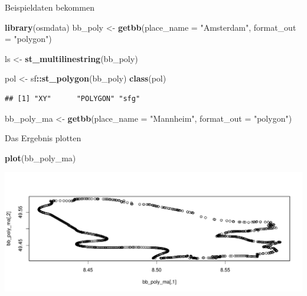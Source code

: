 \documentclass[ignorenonframetext,]{beamer}
\newenvironment{Shaded}{\begin{snugshade}}{\end{snugshade}}
\newcommand{\KeywordTok}[1]{\textcolor[rgb]{0.13,0.29,0.53}{\textbf{#1}}}
\newcommand{\DataTypeTok}[1]{\textcolor[rgb]{0.13,0.29,0.53}{#1}}
\newcommand{\StringTok}[1]{\textcolor[rgb]{0.31,0.60,0.02}{#1}}
\newcommand{\OperatorTok}[1]{\textcolor[rgb]{0.81,0.36,0.00}{\textbf{#1}}}
\newcommand{\NormalTok}[1]{#1}
\begin{document}
\begin{frame}[fragile]{Beispieldaten bekommen}

\begin{Shaded}
\begin{Highlighting}[]
\KeywordTok{library}\NormalTok{(osmdata)}
\NormalTok{bb_poly <-}\StringTok{ }\KeywordTok{getbb}\NormalTok{(}\DataTypeTok{place_name =} \StringTok{"Amsterdam"}\NormalTok{, }
                 \DataTypeTok{format_out =} \StringTok{"polygon"}\NormalTok{)}
\end{Highlighting}
\end{Shaded}

\begin{Shaded}
\begin{Highlighting}[]
\NormalTok{ls <-}\StringTok{ }\KeywordTok{st_multilinestring}\NormalTok{(bb_poly)}
\end{Highlighting}
\end{Shaded}

\begin{Shaded}
\begin{Highlighting}[]
\NormalTok{pol <-}\StringTok{ }\NormalTok{sf}\OperatorTok{::}\KeywordTok{st_polygon}\NormalTok{(bb_poly)}
\KeywordTok{class}\NormalTok{(pol)}
\end{Highlighting}
\end{Shaded}

\begin{verbatim}
## [1] "XY"      "POLYGON" "sfg"
\end{verbatim}

\begin{Shaded}
\begin{Highlighting}[]
\NormalTok{bb_poly_ma <-}\StringTok{ }\KeywordTok{getbb}\NormalTok{(}\DataTypeTok{place_name =} \StringTok{"Mannheim"}\NormalTok{, }
                 \DataTypeTok{format_out =} \StringTok{"polygon"}\NormalTok{)}
\end{Highlighting}
\end{Shaded}

\end{frame}

\begin{frame}[fragile]{Das Ergebnis plotten}

\begin{Shaded}
\begin{Highlighting}[]
\KeywordTok{plot}\NormalTok{(bb_poly_ma)}
\end{Highlighting}
\end{Shaded}

\includegraphics{slides_all2gether_part2_files/figure-beamer/unnamed-chunk-185-1.pdf}

\end{frame}
\end{document}
